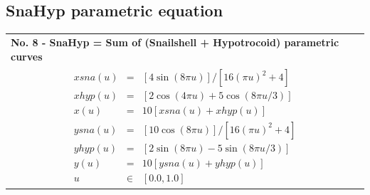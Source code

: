\subsection{SnaHyp parametric equation}

\begin{table}[ht]
	\begin{center}
		\begin{tabular}[top]{ |p{16.0 cm}| }
			\rowcolor{LIGHTCYAN}			
		 
			\rowcolor{LIGHTCYAN}
			\hline \textbf{No. 8 - SnaHyp = Sum of (Snailshell + Hypotrocoid) parametric curves}\\

			\begin{eqnarray}
				xsna(u) & = & [4\sin(8\pi u) ] / [16 (\pi u)^2 + 4] \nonumber \\
				xhyp(u) & = & [2\cos(4\pi u)  + 5\cos(8\pi u /3)  ] \nonumber \\
				x(u) & = & 10[xsna(u) + xhyp(u)] \nonumber \\
			    ysna(u) & = & [10\cos(8\pi u)] / [16 (\pi u)^2 + 4] \nonumber \\
				yhyp(u) & = & [2\sin(8\pi u) - 5\sin(8\pi u /3)] \nonumber \\
				y(u) & = & 10[ysna(u) + yhyp(u)] \nonumber \\
				u & \in & [0.0, 1.0] \nonumber
			\end{eqnarray}


			

\end{tabular}
\end{center}
\end{table}
